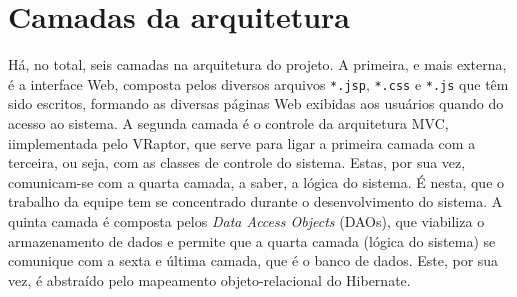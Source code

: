 \documentclass[11pt, a4paper]{article}
\begin{document}
    \section{Camadas da arquitetura}
        Há, no total, seis camadas na arquitetura do projeto. A primeira, e mais
        externa, é a interface Web, composta pelos diversos arquivos
        \texttt{*.jsp}, \texttt{*.css} e \texttt{*.js} que têm sido escritos, formando as 
		diversas páginas Web exibidas aos usuários quando do acesso ao sistema.
        A segunda camada é o controle da arquitetura MVC, iimplementada pelo VRaptor, que serve para ligar a primeira camada com a terceira, ou seja, com as classes de controle do sistema. Estas, por sua vez, comunicam-se 
        com a quarta camada, a saber, a lógica do sistema. É nesta, que o trabalho da equipe 
tem se concentrado durante o desenvolvimento do sistema.  A quinta camada é composta pelos \textit{Data Access Objects} (DAOs), que viabiliza o armazenamento de dados e permite que a quarta camada (lógica do sistema) se comunique  com a  sexta e última camada, que é o banco de dados. Este, por sua vez, é abstraído pelo  mapeamento objeto-relacional do Hibernate.
\end{document}

